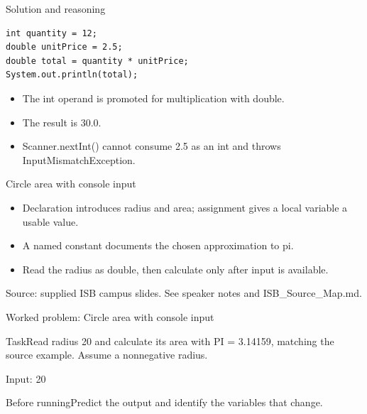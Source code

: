 \documentclass[10pt,aspectratio=169]{beamer}
\begin{document}
\begin{frame}[fragile,t]{Solution and reasoning}
\begin{lstlisting}
int quantity = 12;
double unitPrice = 2.5;
double total = quantity * unitPrice;
System.out.println(total);
\end{lstlisting}\vspace{1mm}\small\begin{itemize}
\item The int operand is promoted for multiplication with double.
\item The result is 30.0.
\item Scanner.nextInt() cannot consume 2.5 as an int and throws InputMismatchException.
\end{itemize}
\end{frame}

\begin{frame}[fragile,t]{Circle area with console input}
\begin{itemize}
\item Declaration introduces radius and area; assignment gives a local variable a usable value.
\item A named constant documents the chosen approximation to pi.
\item Read the radius as double, then calculate only after input is available.
\end{itemize}
\vspace{3mm}\footnotesize\textcolor{accent}{Source: supplied ISB campus slides. See speaker notes and ISB\_Source\_Map.md.}
\end{frame}

\begin{frame}[fragile,t]{Worked problem: Circle area with console input}
\begin{block}{Task}Read radius 20 and calculate its area with PI = 3.14159, matching the source example. Assume a nonnegative radius.\end{block}
\small Input: 20\par\vspace{3mm}\begin{exampleblock}{Before running}Predict the output and identify the variables that change.\end{exampleblock}
\end{frame}
\end{document}
